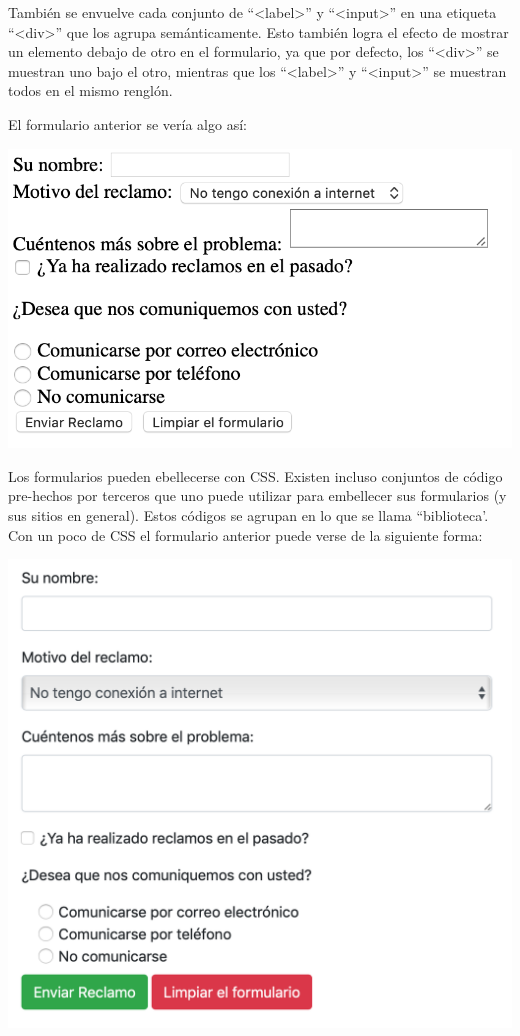 También se envuelve cada conjunto de ``<label>'' y ``<input>'' en una
etiqueta ``<div>'' que los agrupa semánticamente. Esto también logra el
efecto de mostrar un elemento debajo de otro en el formulario, ya que por
defecto, los ``<div>'' se muestran uno bajo el otro, mientras que los
``<label>'' y ``<input>'' se muestran todos en el mismo renglón.

El formulario anterior se vería algo así:

\includegraphics[scale=0.7]{apendices/html/imagenes/form_sample_no_css.png}

Los formularios pueden ebellecerse con CSS. Existen incluso conjuntos de código
pre-hechos por terceros que uno puede utilizar para embellecer sus formularios
(y sus sitios en general). Estos códigos se agrupan en lo que se llama ``biblioteca'.
Con un poco de CSS el formulario anterior puede verse de la siguiente forma:

\centerline{\includegraphics[scale=0.5]{apendices/html/imagenes/form_sample_css.png}}

